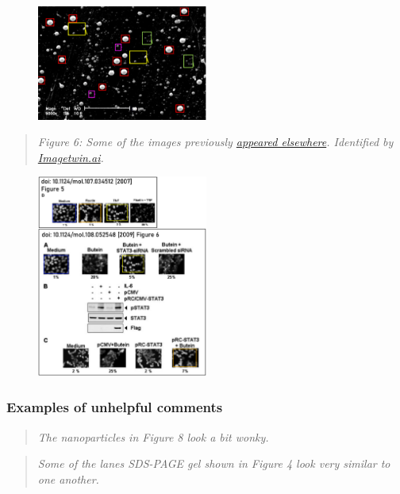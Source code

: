 \documentclass[letterpaper, 12pt]{article}
\begin{document}
\begin{figure}[h!tbp]
\centering
    \includegraphics[width=0.5\textwidth]{img/pubpeer/pubpeer_dupes.PNG}
\end{figure}

\pagebreak
\begin{quote}
    \textit{Figure 6: Some of the images previously \href{https://pubpeer.com/publications/2E9CC5D00FDE41668A28B9622E64ED}{appeared elsewhere}. Identified by \href{https://imagetwin.ai}{Imagetwin.ai}.}
\end{quote}

\begin{figure}[h!tbp]
\centering
    \includegraphics[width=0.5\textwidth]{img/pubpeer/image-1729709836291.png}
\end{figure}

\subsubsection*{Examples of unhelpful comments}

\begin{quote}
    \textit{The nanoparticles in Figure 8 look a bit wonky.}
\end{quote}

\begin{quote}
    \textit{Some of the lanes SDS-PAGE gel shown in Figure 4 look very similar to one another.}
\end{quote}
\end{document}
